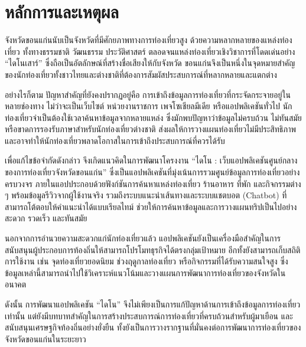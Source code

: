 \section{หลักการและเหตุผล}

จังหวัดขอนแก่นนับเป็นจังหวัดที่มีศักยภาพทางการท่องเที่ยวสูง ด้วยความหลากหลายของแหล่งท่องเที่ยว ทั้งทางธรรมชาติ วัฒนธรรม ประวัติศาสตร์ ตลอดจนแหล่งท่องเที่ยวเชิงวิชาการที่โดดเด่นอย่าง ``ไดโนเสาร์'' ซึ่งถือเป็นอัตลักษณ์ที่สร้างชื่อเสียงให้กับจังหวัด ขอนแก่นจึงเป็นหนึ่งในจุดหมายสำคัญของนักท่องเที่ยวทั้งชาวไทยและต่างชาติที่ต้องการสัมผัสประสบการณ์ที่หลากหลายและแตกต่าง

อย่างไรก็ตาม ปัญหาสำคัญที่ยังคงปรากฏอยู่คือ การเข้าถึงข้อมูลการท่องเที่ยวที่กระจัดกระจายอยู่ในหลายช่องทาง ไม่ว่าจะเป็นเว็บไซต์ หน่วยงานราชการ เพจโซเชียลมีเดีย หรือแอปพลิเคชันทั่วไป นักท่องเที่ยวจำเป็นต้องใช้เวลาค้นหาข้อมูลจากหลายแหล่ง ซึ่งมักพบปัญหาว่าข้อมูลไม่ครบถ้วน ไม่ทันสมัย หรือขาดการรองรับภาษาสำหรับนักท่องเที่ยวต่างชาติ ส่งผลให้การวางแผนท่องเที่ยวไม่มีประสิทธิภาพและอาจทำให้นักท่องเที่ยวพลาดโอกาสในการเข้าถึงประสบการณ์ที่ควรได้รับ

เพื่อแก้ไขข้อจำกัดดังกล่าว จึงเกิดแนวคิดในการพัฒนาโครงงาน ``ไดโน : เว็บแอปพลิเคชันศูนย์กลางของการท่องเที่ยวจังหวัดขอนแก่น'' ซึ่งเป็นแอปพลิเคชันที่มุ่งเน้นการรวมศูนย์ข้อมูลการท่องเที่ยวอย่างครบวงจร ภายในแอปประกอบด้วยฟังก์ชันการค้นหาแหล่งท่องเที่ยว ร้านอาหาร ที่พัก และกิจกรรมต่าง ๆ พร้อมข้อมูลรีวิวจากผู้ใช้งานจริง รวมถึงระบบแนะนำเส้นทางและระบบแชตบอต (Chatbot) ที่สามารถโต้ตอบให้คำแนะนำได้แบบเรียลไทม์ ช่วยให้การค้นหาข้อมูลและการวางแผนทริปเป็นไปอย่างสะดวก รวดเร็ว และทันสมัย

นอกจากการอำนวยความสะดวกแก่นักท่องเที่ยวแล้ว แอปพลิเคชันยังเป็นเครื่องมือสำคัญในการสนับสนุนผู้ประกอบการท้องถิ่นให้สามารถโปรโมทธุรกิจได้ตรงกลุ่มเป้าหมาย อีกทั้งยังสามารถเก็บสถิติการใช้งาน เช่น จุดท่องเที่ยวยอดนิยม ช่วงฤดูกาลท่องเที่ยว หรือกิจกรรมที่ได้รับความสนใจสูง ซึ่งข้อมูลเหล่านี้สามารถนำไปใช้วิเคราะห์แนวโน้มและวางแผนการพัฒนาการท่องเที่ยวของจังหวัดในอนาคต

ดังนั้น การพัฒนาแอปพลิเคชัน ``ไดโน'' จึงไม่เพียงเป็นการแก้ปัญหาด้านการเข้าถึงข้อมูลการท่องเที่ยวเท่านั้น แต่ยังมีบทบาทสำคัญในการสร้างประสบการณ์การท่องเที่ยวที่ครบถ้วนสำหรับผู้มาเยือน และสนับสนุนเศรษฐกิจท้องถิ่นอย่างยั่งยืน ทั้งยังเป็นการวางรากฐานที่มั่นคงต่อการพัฒนาการท่องเที่ยวของจังหวัดขอนแก่นในระยะยาว

